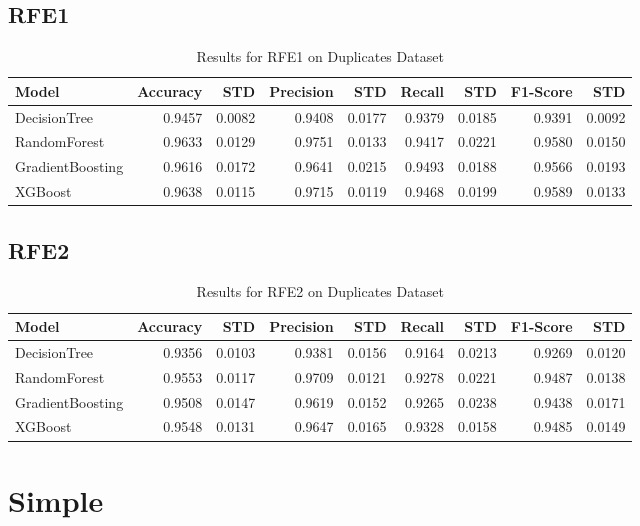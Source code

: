 \documentclass{article}
\begin{document}
\subsection{RFE1}
\begin{table}[h!]
\centering
\caption{Results for RFE1 on Duplicates Dataset}
\begin{tabular}{l|rr|rr|rr|rr}
\hline
Model & Accuracy & STD & Precision & STD & Recall & STD & F1-Score & STD \\
\hline
DecisionTree & 0.9457 & 0.0082 & 0.9408 & 0.0177 & 0.9379 & 0.0185 & 0.9391 & 0.0092 \\
RandomForest & 0.9633 & 0.0129 & 0.9751 & 0.0133 & 0.9417 & 0.0221 & 0.9580 & 0.0150 \\
GradientBoosting & 0.9616 & 0.0172 & 0.9641 & 0.0215 & 0.9493 & 0.0188 & 0.9566 & 0.0193 \\
XGBoost & 0.9638 & 0.0115 & 0.9715 & 0.0119 & 0.9468 & 0.0199 & 0.9589 & 0.0133 \\
\hline
\end{tabular}
\end{table}

\subsection{RFE2}
\begin{table}[h!]
\centering
\caption{Results for RFE2 on Duplicates Dataset}
\begin{tabular}{l|rr|rr|rr|rr}
\hline
Model & Accuracy & STD & Precision & STD & Recall & STD & F1-Score & STD \\
\hline
DecisionTree & 0.9356 & 0.0103 & 0.9381 & 0.0156 & 0.9164 & 0.0213 & 0.9269 & 0.0120 \\
RandomForest & 0.9553 & 0.0117 & 0.9709 & 0.0121 & 0.9278 & 0.0221 & 0.9487 & 0.0138 \\
GradientBoosting & 0.9508 & 0.0147 & 0.9619 & 0.0152 & 0.9265 & 0.0238 & 0.9438 & 0.0171 \\
XGBoost & 0.9548 & 0.0131 & 0.9647 & 0.0165 & 0.9328 & 0.0158 & 0.9485 & 0.0149 \\
\hline
\end{tabular}
\end{table}

\section{Simple}
\end{document}
